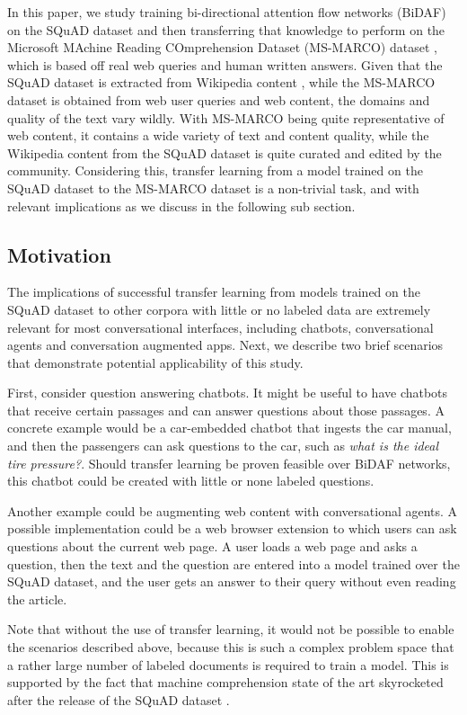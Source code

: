 \documentclass[11pt,a4paper]{article}
\begin{document}
In this paper, we study training bi-directional attention flow networks (BiDAF) on the SQuAD dataset and then transferring that knowledge to perform on the Microsoft MAchine Reading COmprehension Dataset (MS-MARCO) dataset \cite{msmarco:2016}, which is based off real web queries and human written answers. Given that the SQuAD dataset is extracted from Wikipedia content \cite{squad:2016}, while the MS-MARCO dataset is obtained from web user queries and web content, the domains and quality of the text vary wildly. With MS-MARCO being quite representative of web content, it contains a wide variety of text and content quality, while the Wikipedia content from the SQuAD dataset is quite curated and edited by the community. Considering this, transfer learning from a model trained on the SQuAD dataset to the MS-MARCO dataset is a non-trivial task, and with relevant implications as we discuss in the following sub section.

\subsection{Motivation}

The implications of successful transfer learning from models trained on the SQuAD dataset to other corpora with little or no labeled data are extremely relevant for most conversational interfaces, including chatbots, conversational agents and conversation augmented apps. Next, we describe two brief scenarios that demonstrate potential applicability of this study.

First, consider question answering chatbots. It might be useful to have chatbots that receive certain passages and can answer questions about those passages. A concrete example would be a car-embedded chatbot that ingests the car manual, and then the passengers can ask questions to the car, such as \textit{what is the ideal tire pressure?}. Should transfer learning be proven feasible over BiDAF networks, this chatbot could be created with little or none labeled questions.

Another example could be augmenting web content with conversational agents. A possible implementation could be a web browser extension to which users can ask questions about the current web page. A user loads a web page and asks a question, then the text and the question are entered into a model trained over the SQuAD dataset, and the user gets an answer to their query without even reading the article.

Note that without the use of transfer learning, it would not be possible to enable the scenarios described above, because this is such a complex problem space that a rather large number of labeled documents is required to train a model. This is supported by the fact that machine comprehension state of the art skyrocketed after the release of the SQuAD dataset \cite{rnet} \cite{bidaf:2017}. 
\end{document}
